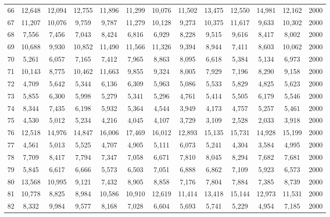 {\begin{longtable}{ >{\footnotesize}ccccccccccccc}
66  & 12,648 & 12,094 & 12,755 & 11,896 & 11,299 & 10,076 & 11,502 & 13,475 & 12,550 & 14,981 & 12,162 & 2000 \\
67  & 11,207 & 10,076 & 9,759  & 9,787  & 11,279 & 10,128 & 9,273  & 10,375 & 11,617 & 9,633  & 10,302 & 2000 \\
68  & 7,556  & 7,456  & 7,043  & 8,424  & 6,816  & 6,929  & 8,228  & 9,515  & 9,616  & 8,417  & 8,002  & 2000 \\
69  & 10,688 & 9,930  & 10,852 & 11,490 & 11,566 & 11,326 & 9,394  & 8,944  & 7,411  & 8,603  & 10,062 & 2000 \\
70  & 5,261  & 6,057  & 7,165  & 7,412  & 7,965  & 8,863  & 8,095  & 6,618  & 5,384  & 5,134  & 6,973  & 2000 \\
71  & 10,143 & 8,775  & 10,462 & 11,663 & 9,855  & 9,324  & 8,005  & 7,929  & 7,196  & 8,290  & 9,158  & 2000 \\
72  & 4,709  & 5,642  & 5,344  & 6,136  & 6,309  & 5,963  & 5,086  & 5,533  & 5,829  & 4,825  & 5,623  & 2000 \\
73  & 5,855  & 6,300  & 5,998  & 5,279  & 5,341  & 5,296  & 4,761  & 5,414  & 5,505  & 6,179  & 5,546  & 2000 \\
74  & 8,344  & 7,435  & 6,198  & 5,932  & 5,364  & 4,544  & 3,949  & 4,173  & 4,757  & 5,257  & 5,461  & 2000 \\
75  & 4,530  & 5,012  & 5,234  & 4,216  & 4,045  & 4,107  & 3,729  & 3,109  & 2,528  & 2,033  & 3,918  & 2000 \\
76  & 12,518 & 14,976 & 14,847 & 16,006 & 17,469 & 16,012 & 12,893 & 15,135 & 15,731 & 14,928 & 15,199 & 2000 \\
77  & 4,561  & 5,013  & 5,525  & 4,707  & 4,905  & 5,111  & 6,073  & 5,241  & 4,304  & 3,584  & 4,995  & 2000 \\
78  & 7,709  & 8,417  & 7,794  & 7,347  & 7,058  & 6,671  & 7,810  & 8,045  & 8,294  & 7,682  & 7,681  & 2000 \\
79  & 5,845  & 6,617  & 6,666  & 5,573  & 6,503  & 7,051  & 6,888  & 6,862  & 7,109  & 5,923  & 6,573  & 2000 \\
80  & 13,568 & 10,995 & 9,121  & 7,432  & 8,905  & 8,858  & 7,176  & 7,804  & 7,884  & 7,385  & 8,739  & 2000 \\
81  & 10,778 & 8,825  & 8,984  & 10,586 & 10,910 & 12,619 & 11,414 & 13,418 & 15,144 & 12,973 & 11,531 & 2000 \\
82  & 8,332  & 9,984  & 9,577  & 8,168  & 7,028  & 6,604  & 5,693  & 5,741  & 5,229  & 4,954  & 7,185  & 2000 \\

\end{longtable}}
